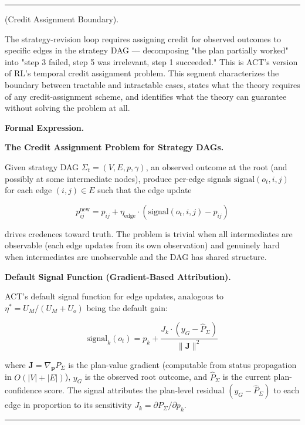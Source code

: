 \documentclass[11pt,oneside]{article}
\newcounter{claim}[section]
\renewcommand{\theclaim}{\thesection.\arabic{claim}}
\newenvironment{segment}[2]{%
  \refstepcounter{claim}%
  \bigskip\noindent\hrule\smallskip
  \noindent{\bfseries #1~\theclaim}\enskip(#2).\par\smallskip
  \noindent\ignorespaces
}{%
  \par\smallskip\noindent\hrule\bigskip
}
\newenvironment{discussion}[1][]{\begin{segment}{Discussion}{#1}}{\end{segment}}
\begin{document}
\begin{discussion}[Credit Assignment Boundary]
\label{credit-assignment-boundary}
The strategy-revision loop requires assigning credit for observed outcomes to specific edges in the strategy DAG — decomposing "the plan partially worked" into "step 3 failed, step 5 was irrelevant, step 1 succeeded." This is ACT's version of RL's temporal credit assignment problem. This segment characterizes the boundary between tractable and intractable cases, states what the theory requires of any credit-assignment scheme, and identifies what the theory can guarantee without solving the problem at all.



\medskip\noindent\textbf{Formal Expression.}



\medskip\noindent\textbf{The Credit Assignment Problem for Strategy DAGs.}



Given strategy DAG $\Sigma_t = (V, E, p, \gamma)$, an observed outcome at the root (and possibly at some intermediate nodes), produce per-edge signals $\text{signal}(o_t, i, j)$ for each edge $(i,j) \in E$ such that the edge update

$$p_{ij}^{\text{new}} = p_{ij} + \eta_{\text{edge}} \cdot (\text{signal}(o_t, i, j) - p_{ij})$$

drives credences toward truth. The problem is trivial when all intermediates are observable (each edge updates from its own observation) and genuinely hard when intermediates are unobservable and the DAG has shared structure.


\medskip\noindent\textbf{Default Signal Function (Gradient-Based Attribution).}



ACT's default signal function for edge updates, analogous to $\eta^* = U_M/(U_M + U_o)$ being the default gain:

$$\text{signal}_k(o_t) = p_k + \frac{J_k \cdot (y_G - \hat P_\Sigma)}{\lVert\mathbf{J}\rVert^2}$$

where $\mathbf{J} = \nabla_\mathbf{p} P_\Sigma$ is the plan-value gradient (computable from status propagation in $O(\lvert V\rvert + \lvert E\rvert)$), $y_G$ is the observed root outcome, and $\hat P_\Sigma$ is the current plan-confidence score. The signal attributes the plan-level residual $(y_G - \hat P_\Sigma)$ to each edge in proportion to its sensitivity $J_k = \partial P_\Sigma / \partial p_k$.


\end{discussion}
\end{document}
